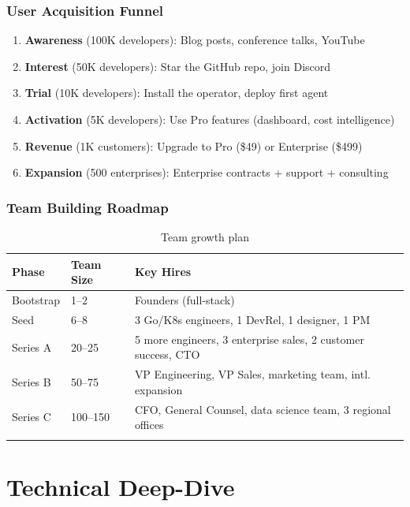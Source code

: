\documentclass[12pt,a4paper,openany]{report}
\begin{document}
\section{User Acquisition Funnel}

\begin{enumerate}
    \item \textbf{Awareness} (100K developers): Blog posts, conference talks, YouTube
    \item \textbf{Interest} (50K developers): Star the GitHub repo, join Discord
    \item \textbf{Trial} (10K developers): Install the operator, deploy first agent
    \item \textbf{Activation} (5K developers): Use Pro features (dashboard, cost intelligence)
    \item \textbf{Revenue} (1K customers): Upgrade to Pro (\$49) or Enterprise (\$499)
    \item \textbf{Expansion} (500 enterprises): Enterprise contracts + support + consulting
\end{enumerate}

\section{Team Building Roadmap}

\begin{longtable}{p{2cm}p{2.5cm}p{8.5cm}}
\toprule
\textbf{Phase} & \textbf{Team Size} & \textbf{Key Hires} \\
\midrule
Bootstrap & 1--2 & Founders (full-stack) \\
Seed & 6--8 & 3 Go/K8s engineers, 1 DevRel, 1 designer, 1 PM \\
Series A & 20--25 & 5 more engineers, 3 enterprise sales, 2 customer success, CTO \\
Series B & 50--75 & VP Engineering, VP Sales, marketing team, intl. expansion \\
Series C & 100--150 & CFO, General Counsel, data science team, 3 regional offices \\
\bottomrule
\caption{Team growth plan}
\end{longtable}


\part{Technical Deep-Dive}
\end{document}
